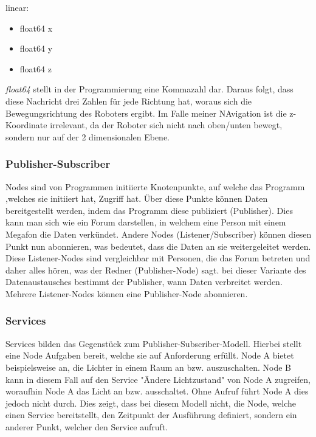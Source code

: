 {{{			linear:
			\begin{itemize}
				\item float64 x
				\item float64 y
				\item float64 z
			\end{itemize}
			
			\textit{float64} stellt in der Programmierung eine Kommazahl dar. Daraus folgt, dass diese Nachricht drei Zahlen für jede Richtung hat, woraus sich die Bewegungsrichtung des Roboters ergibt. Im Falle meiner NAvigation ist die z-Koordinate irrelevant, da der Roboter sich nicht nach oben/unten bewegt, sondern nur auf der 2 dimensionalen Ebene.
		}
		
		\subsubsection{Publisher-Subscriber}
		{
			Nodes sind von Programmen initiierte Knotenpunkte, auf welche das Programm ,welches sie initiiert hat, Zugriff hat. Über diese Punkte können Daten bereitgestellt werden, indem das Programm diese publiziert (Publisher). Dies kann man sich wie ein Forum darstellen, in welchem eine Person mit einem Megafon die Daten verkündet. Andere Nodes (Listener/Subscriber) können diesen Punkt nun abonnieren, was bedeutet, dass die Daten an sie weitergeleitet werden. Diese Listener-Nodes sind vergleichbar mit Personen, die das Forum betreten und daher alles hören, was der Redner (Publisher-Node) sagt. bei dieser Variante des Datenaustausches bestimmt der Publisher, wann Daten verbreitet werden. Mehrere Listener-Nodes können eine Publisher-Node abonnieren.
		}
		\subsubsection{Services}
		{ 
			Services bilden das Gegenstück zum Publisher-Subscriber-Modell. Hierbei stellt eine Node Aufgaben bereit, welche sie auf Anforderung erfüllt. Node A bietet beispielsweise an, die Lichter in einem Raum an bzw. auszuschalten. Node B kann in diesem Fall auf den Service "Ändere Lichtzustand" von Node A zugreifen, woraufhin Node A das Licht an bzw. ausschaltet. Ohne Aufruf führt Node A dies jedoch nicht durch. Dies zeigt, dass bei diesem Modell nicht, die Node, welche einen Service bereitstellt, den Zeitpunkt der Ausführung definiert, sondern ein anderer Punkt, welcher den Service aufruft.
		}
		
}}
